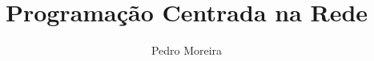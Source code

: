 \documentclass[11pt, a4paper, twoside, a4wide, headsepline, bibtotoc]{report}
\title{Programação Centrada na Rede}
\author{Pedro Moreira}
\date{\displaydate{date}}
\begin{document}

\newcommand{\code}[1]{\lstinline{#1}}
\end{document}
